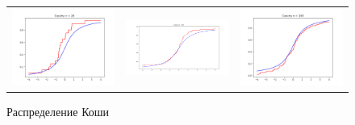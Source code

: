 	\begin{figure}[H]
		\centering
		\begin{tabular}{ccc}
			\includegraphics[width=55mm, height =0.25\textheight]{pics/emp_c_20.png}
			&
			\includegraphics[width=55mm, height =0.25\textheight]{pics/emp_c_60.png}
			&
			\includegraphics[width=55mm, height =0.25\textheight]{pics/emp_c_100.png}
		\end{tabular}
		\caption{Распределение Коши}
		\label{fig:cauchy}
	\end{figure}
	

